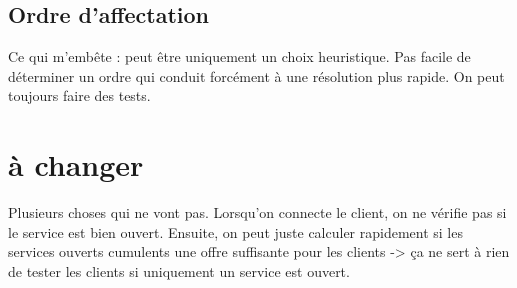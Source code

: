 \subsection{Ordre d'affectation}

Ce qui m'embête : peut être uniquement un choix heuristique. Pas facile de déterminer un ordre qui conduit forcément à une résolution plus rapide.
On peut toujours faire des tests.

\section{à changer}

Plusieurs choses qui ne vont pas. Lorsqu'on connecte le client, on ne vérifie pas si le service est bien ouvert.
Ensuite, on peut juste calculer rapidement si les services ouverts cumulents une offre suffisante pour les clients -> ça ne sert à rien de tester les clients si uniquement un service est ouvert.
